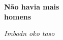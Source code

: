 

\begingroup\thispagestyle{empty}\vspace*{.05\textheight} 

              \formular
              \huge
              \noindent
              \textbf{Não havia mais\\homens}
              
              \vspace{0.3em}

              \noindent\Large\textit{Imbodn oko taso}
                    
\endgroup
\vfill
\pagebreak